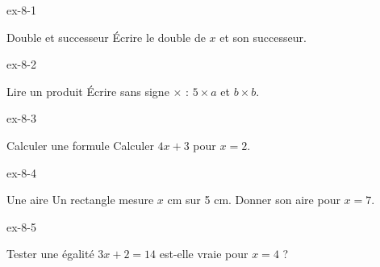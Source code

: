\clearpage{}
\begin{blocLivre}{ex-8-1}\begin{exercice}[1]{Double et successeur}
Écrire le double de $x$ et son successeur.
\end{exercice}\end{blocLivre}
\begin{blocLivre}{ex-8-2}\begin{exercice}[1]{Lire un produit}
Écrire sans signe $\times$ : $5\times a$ et $b\times b$.
\end{exercice}\end{blocLivre}
\begin{blocLivre}{ex-8-3}\begin{exercice}[1]{Calculer une formule}
Calculer $4x+3$ pour $x=2$.
\end{exercice}\end{blocLivre}
\begin{blocLivre}{ex-8-4}\begin{exercice}[1]{Une aire}
Un rectangle mesure $x$ cm sur 5 cm. Donner son aire pour $x=7$.
\label{fig-ex-8-4}
\end{exercice}\end{blocLivre}
\begin{blocLivre}{ex-8-5}\begin{exercice}[1]{Tester une égalité}
$3x+2=14$ est-elle vraie pour $x=4$ ?
\end{exercice}\end{blocLivre}

